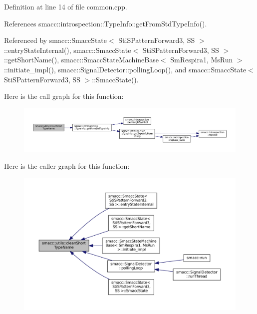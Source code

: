 Definition at line 14 of file common.\+cpp.



References smacc\+::introspection\+::\+Type\+Info\+::get\+From\+Std\+Type\+Info().



Referenced by smacc\+::\+Smacc\+State$<$ Sti\+S\+Pattern\+Forward3, S\+S $>$\+::entry\+State\+Internal(), smacc\+::\+Smacc\+State$<$ Sti\+S\+Pattern\+Forward3, S\+S $>$\+::get\+Short\+Name(), smacc\+::\+Smacc\+State\+Machine\+Base$<$ Sm\+Respira1, Ms\+Run $>$\+::initiate\+\_\+impl(), smacc\+::\+Signal\+Detector\+::polling\+Loop(), and smacc\+::\+Smacc\+State$<$ Sti\+S\+Pattern\+Forward3, S\+S $>$\+::\+Smacc\+State().


Here is the call graph for this function\+:
\nopagebreak
\begin{figure}[H]
\begin{center}
\leavevmode
\includegraphics[width=350pt]{namespacesmacc_1_1utils_aacd1975bb7cd9bec4b50e111a2ae7edb_cgraph}
\end{center}
\end{figure}
Here is the caller graph for this function\+:
\nopagebreak
\begin{figure}[H]
\begin{center}
\leavevmode
\includegraphics[width=350pt]{namespacesmacc_1_1utils_aacd1975bb7cd9bec4b50e111a2ae7edb_icgraph}
\end{center}
\end{figure}
